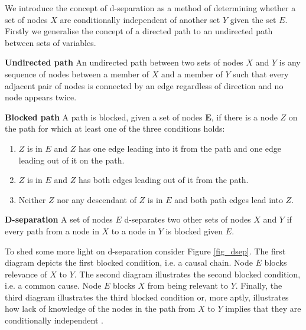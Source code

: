 We introduce the concept of d-separation as a method of determining whether a set of nodes $X$ are conditionally independent of another set $Y$ given the set $E$. Firstly we generalise the concept of a directed path to an undirected path between sets of variables.
\begin{defn}
\textbf{Undirected path} An undirected path between two sets of nodes $X$ and $Y$ is any sequence of nodes between a member of $X$ and a member of $Y$ such that every adjacent pair of nodes is connected by an edge regardless of direction and no node appears twice.
\end{defn}
\begin{defn}
\textbf{Blocked path} A path is blocked, given a set of nodes $\mathbf{E}$, if there is a node $Z$ on the path for which at least one of the three conditions holds:
\begin{enumerate}
\item
$Z$ is in $E$ and $Z$ has one edge leading into it from the path and one edge leading out of it on the path.
\item
$Z$ is in $E$ and $Z$ has both edges leading out of it from the path.
\item
Neither $Z$ nor any descendant of $Z$ is in $E$ and both path edges lead into $Z$.
\end{enumerate}
\end{defn}
\begin{defn}
\textbf{D-separation} A set of nodes $E$ d-separates two other sets of nodes $X$ and $Y$ if every path from a node in $X$ to a node in $Y$ is blocked given $E$.
\end{defn}
To shed some more light on d-separation consider Figure \ref{fig_dsep}. The first diagram depicts the first blocked condition, i.e. a causal chain. Node $E$ blocks relevance of $X$ to $Y$. The second diagram illustrates the second blocked condition, i.e. a common cause. Node $E$ blocks $X$ from being relevant to $Y$. Finally, the third diagram illustrates the third blocked condition or, more aptly, illustrates how lack of knowledge of the nodes in the path from $X$ to $Y$ implies that they are conditionally independent \cite{korb}.
